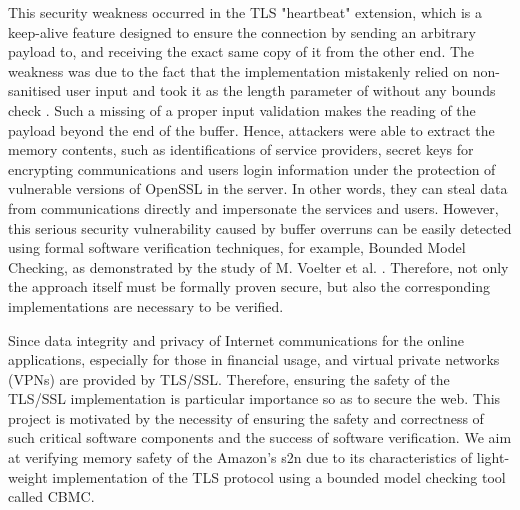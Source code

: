 This security weakness occurred in the TLS "heartbeat" extension, which is a keep-alive feature designed to ensure the connection by sending an arbitrary payload to, and receiving the exact same copy of it from the other end. The weakness was due to the fact that the implementation mistakenly relied on non-sanitised user input and took it as the length parameter of  without any bounds check \cite{6_heartbleed_bug}. Such a missing of a proper input validation makes the reading of the payload beyond the end of the buffer. Hence, attackers were able to extract the memory contents, such as identifications of service providers, secret keys for encrypting communications and users login information under the protection of vulnerable versions of OpenSSL in the server. In other words, they can steal data from communications directly and impersonate the services and users. However, this serious security vulnerability caused by buffer overruns can be easily detected using formal software verification techniques, for example, Bounded Model Checking, as demonstrated by the study of M. Voelter et al. \cite{Voelter:2015:TIS:2846696.2846698}. Therefore, not only the approach itself must be formally proven secure, but also the corresponding implementations are necessary to be verified.

Since data integrity and privacy of Internet communications for the online applications, especially for those in financial usage, and virtual private networks (VPNs) are provided by TLS/SSL. Therefore, ensuring the safety of the TLS/SSL implementation is particular importance so as to secure the web. This project is motivated by the necessity of ensuring the safety and correctness of such critical software components and the success of software verification. We aim at verifying memory safety of the Amazon's s2n due to its characteristics of light-weight implementation of the TLS protocol using a bounded model checking tool called CBMC.





